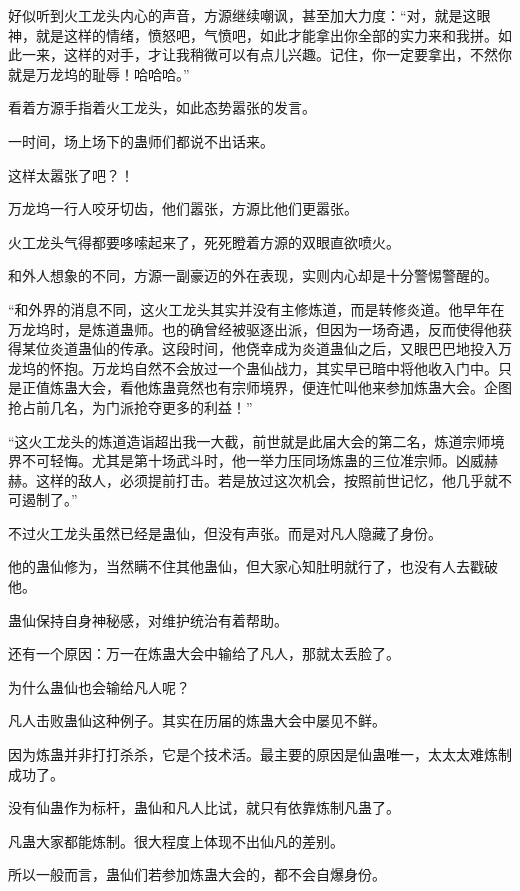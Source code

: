 
\begin{this_body}

好似听到火工龙头内心的声音，方源继续嘲讽，甚至加大力度：“对，就是这眼神，就是这样的情绪，愤怒吧，气愤吧，如此才能拿出你全部的实力来和我拼。如此一来，这样的对手，才让我稍微可以有点儿兴趣。记住，你一定要拿出，不然你就是万龙坞的耻辱！哈哈哈。”

看着方源手指着火工龙头，如此态势嚣张的发言。

一时间，场上场下的蛊师们都说不出话来。

这样太嚣张了吧？！

万龙坞一行人咬牙切齿，他们嚣张，方源比他们更嚣张。

火工龙头气得都要哆嗦起来了，死死瞪着方源的双眼直欲喷火。

和外人想象的不同，方源一副豪迈的外在表现，实则内心却是十分警惕警醒的。

“和外界的消息不同，这火工龙头其实并没有主修炼道，而是转修炎道。他早年在万龙坞时，是炼道蛊师。也的确曾经被驱逐出派，但因为一场奇遇，反而使得他获得某位炎道蛊仙的传承。这段时间，他侥幸成为炎道蛊仙之后，又眼巴巴地投入万龙坞的怀抱。万龙坞自然不会放过一个蛊仙战力，其实早已暗中将他收入门中。只是正值炼蛊大会，看他炼蛊竟然也有宗师境界，便连忙叫他来参加炼蛊大会。企图抢占前几名，为门派抢夺更多的利益！”

“这火工龙头的炼道造诣超出我一大截，前世就是此届大会的第二名，炼道宗师境界不可轻悔。尤其是第十场武斗时，他一举力压同场炼蛊的三位准宗师。凶威赫赫。这样的敌人，必须提前打击。若是放过这次机会，按照前世记忆，他几乎就不可遏制了。”

不过火工龙头虽然已经是蛊仙，但没有声张。而是对凡人隐藏了身份。

他的蛊仙修为，当然瞒不住其他蛊仙，但大家心知肚明就行了，也没有人去戳破他。

蛊仙保持自身神秘感，对维护统治有着帮助。

还有一个原因：万一在炼蛊大会中输给了凡人，那就太丢脸了。

为什么蛊仙也会输给凡人呢？

凡人击败蛊仙这种例子。其实在历届的炼蛊大会中屡见不鲜。

因为炼蛊并非打打杀杀，它是个技术活。最主要的原因是仙蛊唯一，太太太难炼制成功了。

没有仙蛊作为标杆，蛊仙和凡人比试，就只有依靠炼制凡蛊了。

凡蛊大家都能炼制。很大程度上体现不出仙凡的差别。

所以一般而言，蛊仙们若参加炼蛊大会的，都不会自爆身份。


\end{this_body}
